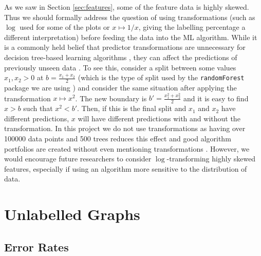 \documentclass{l4proj}
\theoremstyle{definition}
\theoremstyle{remark}
\begin{document}
As we saw in Section \ref{sec:features}, some of the feature data is highly
skewed. Thus we should formally address the question of using transformations
(such as $\log$ used for some of the plots or $x \mapsto 1/x$, giving
the labelling percentage a different interpretation) before feeding the
data into the ML algorithm. While it is a commonly held belief that
predictor transformations are unnecessary for decision tree-based learning
algorithms \cite{DBLP:journals/classification/Friedman06,
  DBLP:books/lib/HastieTF09, cart}, they can affect the predictions of
previously unseen data \cite{DBLP:journals/corr/GaliliM16}. To see this,
consider a split between some values $x_1, x_2 > 0$ at $b =
\frac{x_1+x_2}{2}$ (which is the type of split used by the
\texttt{randomForest} package we are using
\cite{DBLP:journals/corr/GaliliM16}) and consider the same situation after
applying the transformation $x \mapsto x^2$. The new boundary is $b' =
\frac{x_1^2+x_2^2}{2}$ and it is easy to find $x > b$ such that $x^2 < b'$.
Then, if this is the final split and $x_1$ and $x_2$ have different predictions,
$x$ will have different predictions with and without the transformation. In
this project we do not use transformations as having over \num{100000} data
points and 500 trees reduces this effect and good algorithm portfolios are
created without even mentioning transformations
\cite{DBLP:conf/lion/KotthoffKHT15, DBLP:conf/lion/KotthoffMS16}. However, we
would encourage future researchers to consider $\log$-transforming highly skewed
features, especially if using an algorithm more sensitive to the distribution of
data.

\section{Unlabelled Graphs}

\subsection{Error Rates} \label{sec:unlabelled_error_rates}
\end{document}
